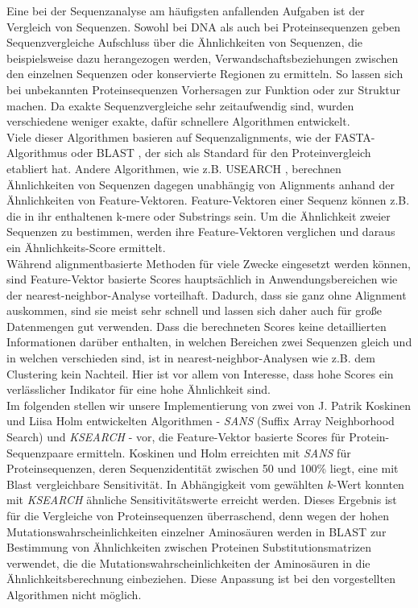 \documentclass{article}
\begin{document}
Eine bei der Sequenzanalyse am häufigsten anfallenden Aufgaben ist der Vergleich
von Sequenzen. 
Sowohl bei DNA als auch bei Proteinsequenzen geben Sequenzvergleiche Aufschluss über die Ähnlichkeiten von Sequenzen, die beispielsweise dazu herangezogen werden, Verwandschaftsbeziehungen 
zwischen den einzelnen Sequenzen oder konservierte Regionen zu ermitteln. So lassen sich bei unbekannten Proteinsequenzen  Vorhersagen zur Funktion oder zur Struktur machen. 
Da exakte Sequenzvergleiche sehr zeitaufwendig sind, wurden verschiedene weniger exakte, dafür schnellere Algorithmen entwickelt.\\
Viele dieser Algorithmen basieren auf Sequenzalignments, wie der FASTA-Al\-gorithmus \cite{FASTA} oder BLAST \cite{BLAST}, der sich als Standard für den Proteinvergleich etabliert hat.
Andere Algorithmen, wie z.B. USEARCH \cite{USEARCH}, berechnen Ähnlichkeiten von Sequenzen dagegen unabhängig von Alignments anhand der Ähnlichkeiten von Feature-Vektoren. 
Feature-Vektoren einer Sequenz können z.B. die in ihr enthaltenen k-mere oder Substrings sein. 
Um die Ähnlichkeit zweier Sequenzen zu bestimmen, werden ihre Feature-Vektoren verglichen und daraus ein Ähnlichkeits-Score ermittelt.\\
Während alignmentbasierte Methoden für viele Zwecke eingesetzt werden können, sind Feature-Vektor basierte Scores hauptsächlich in Anwendungsbereichen wie der nearest-neighbor-Analyse vorteilhaft. 
Dadurch, dass sie ganz ohne Alignment auskommen, sind sie meist sehr schnell und lassen sich daher auch für große Datenmengen gut verwenden. 
Dass die berechneten Scores keine detaillierten Informationen darüber enthalten,
in welchen Bereichen zwei Sequenzen gleich und in welchen verschieden sind, ist in nearest-neighbor-Analysen wie z.B. dem Clustering kein Nachteil. 
Hier ist vor allem von Interesse, dass hohe Scores ein verlässlicher Indikator für eine hohe Ähnlichkeit sind.\\
Im folgenden stellen wir unsere Implementierung von zwei von J. Patrik Koskinen und Liisa Holm entwickelten Algorithmen - \emph{SANS} (Suffix Array Neighborhood Search) und \emph{KSEARCH} - vor, die Feature-Vektor basierte Scores für Protein-Sequenzpaare ermitteln. Koskinen und Holm erreichten mit \emph{SANS} für Proteinsequenzen, deren Sequenzidentität zwischen 50 und 100\% liegt, eine mit Blast vergleichbare Sensitivität. In Abhängigkeit vom gewählten $k$-Wert konnten mit \emph{KSEARCH} ähnliche Sensitivitätswerte erreicht werden. Dieses Ergebnis ist für die Vergleiche von Proteinsequenzen überraschend, denn wegen der hohen Mutationswahrscheinlichkeiten einzelner Aminosäuren werden in BLAST zur Bestimmung von Ähnlichkeiten zwischen Proteinen Substitutionsmatrizen verwendet, die die Mutationswahrscheinlichkeiten der Aminosäuren in die Ähnlich\-keitsberechnung einbeziehen. 
Diese Anpassung ist bei den vorgestellten Algorithmen nicht möglich.
\end{document}
